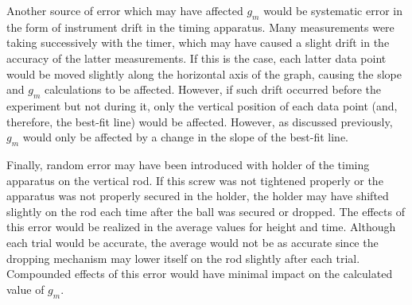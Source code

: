 \documentclass[12pt]{article}
\begin{document}
\begin{discussion}
		Another source of error which may have affected $g_m$ would be systematic error in the form of instrument drift in the timing apparatus. Many measurements were taking successively with the timer, which may have caused a slight drift in the accuracy of the latter measurements. If this is the case, each latter data point would be moved slightly along the horizontal axis of the graph, causing the slope and $g_m$ calculations to be affected. However, if such drift occurred before the experiment but not during it, only the vertical position of each data point (and, therefore, the best-fit line) would be affected. However, as discussed previously, $g_m$ would only be affected by a change in the slope of the best-fit line.
		
		Finally, random error may have been introduced with holder of the timing apparatus on the vertical rod. If this screw was not tightened properly or the apparatus was not properly secured in the holder, the holder may have shifted slightly on the rod each time after the ball was secured or dropped. The effects of this error would be realized in the average values for height and time. Although each trial would be accurate, the average would not be as accurate since the dropping mechanism may lower itself on the rod slightly after each trial. Compounded effects of this error would have minimal impact on the calculated value of $g_m$.
	\end{discussion}
    
\end{document}

